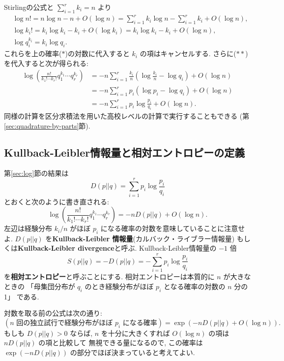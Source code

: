 \documentclass[12pt,twoside]{jarticle}
\theoremstyle{jplain}
\theoremstyle{jplain}
\theoremstyle{jplain}
\numberwithin{theorem}{section}
\numberwithin{equation}{section}
\numberwithin{figure}{section}
\numberwithin{table}{section}
\newcommand\secref[1]{第\ref{#1}節}
\begin{document}
Stirlingの公式と $\sum_{i=1}^r k_i=n$ より
\begin{align*}
&
\log n! 
= n\log n - n + O(\log n)
= \sum_{i=1}^r k_i\log n - \sum_{i=1}^r k_i + O(\log n), 
\\ &
\log k_i! 
= k_i\log k_i - k_i + O(\log k_i) 
= k_i\log k_i - k_i + O(\log n),
\\ &
\log q_i^{k_i} = k_i\log q_i.
\end{align*}
これらを上の確率($*$)の対数に代入すると $k_i$ の項はキャンセルする.
さらに($**$)を代入すると次が得られる:
\begin{align*}
\log\left(\frac{n!}{k_1!\cdots k_r!} q_1^{k_1}\cdots q_r^{k_r}\right)
&
=
- n\sum_{i=1}^r \frac{k_i}{n}\left(\log\frac{k_i}{n}-\log q_i\right) 
+ O(\log n)
\\ &
= -n\sum_{i=1}^r p_i(\log p_i - \log q_i)+O(\log n)
\\ &
= -n\sum_{i=1}^r p_i\log\frac{p_i}{q_i}+O(\log n).
\end{align*}
同様の計算を区分求積法を用いた高校レベルの計算で実行することもできる
(\secref{sec:quadrature-by-parts}).



\subsection{Kullback-Leibler情報量と相対エントロピーの定義}

\secref{sec:log}の結果は
\[
D(p||q)=\sum_{i=1}^r p_i\log\frac{p_i}{q_i}
\]
とおくと次のように書き直される:
\[
\log\left(\frac{n!}{k_1!\cdots k_r!} q_1^{k_1}\cdots q_r^{k_r}\right)
=-n D(p||q) + O(\log n).
\]
左辺は経験分布 $k_i/n$ がほぼ $p_i$ になる確率の対数を意味していることに注意せよ.
$D(p||q)$ を{\bf Kullback-Leibler 情報量}(カルバック・ライブラー情報量)
もしくは{\bf Kullback-Leibler divergence}と呼ぶ.
Kullback-Leibler情報量の $-1$ 倍
\[
S(p||q) = -D(p||q) = - \sum_{i=1}^r p_i\log\frac{p_i}{q_i}
\]
を{\bf 相対エントロピー}と呼ぶことにする.
相対エントロピーは本質的に $n$ が大きなときの
「母集団分布が $q_i$ のとき経験分布がほぼ $p_i$ となる確率の対数の $n$ 分の1」
である.

対数を取る前の公式は次の通り:
\[
(\text{$n$ 回の独立試行で経験分布がほぼ $p_i$ になる確率})
=\exp(-n D(p||q) + O(\log n)).
\]
もしも $D(p||q)>0$ ならば,  
$n$ を十分に大きくすれば $O(\log n)$ の項は $n D(p||q)$ の項と比較して
無視できる量になるので, 
この確率は $\exp(-n D(p||q))$ の部分でほぼ決まっていると考えてよい. 

\end{document}
